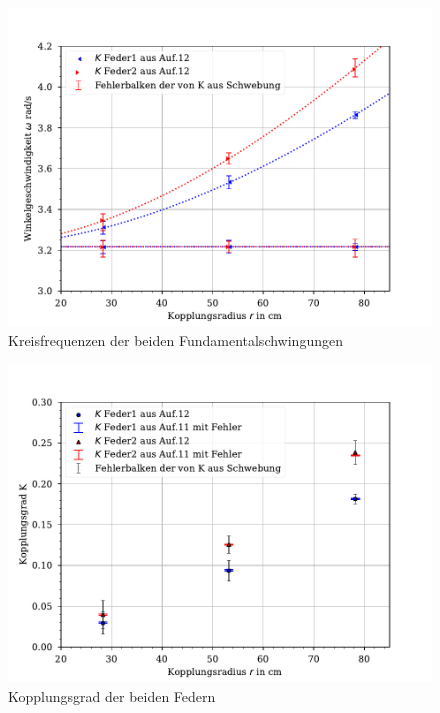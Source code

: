\documentclass[11pt, a4paper]{article}
\begin{document}
    \begin{figure}[!h]
        \centering
        \includegraphics[width=\textwidth]{./plotW.pdf}

        \caption{Kreisfrequenzen der beiden Fundamentalschwingungen}
        \label{fig:plotW}
    \end{figure}
    \begin{figure}[!h]
        \centering
        \includegraphics[width=\textwidth]{./Kplot.pdf}

        \caption{Kopplungsgrad der beiden Federn}
        \label{fig:plotK}
    \end{figure}
\end{document}
